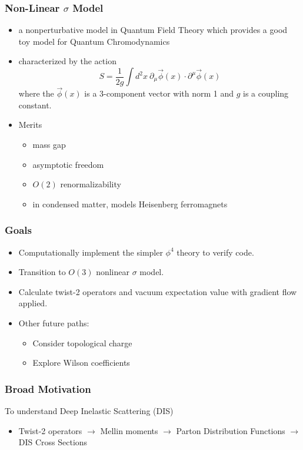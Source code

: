 \documentclass{beamer}
\begin{document}
\begin{frame}
\frametitle{Non-Linear $\sigma$ Model}
\begin{itemize}
    \item a nonperturbative model in Quantum Field Theory which provides a good toy model for Quantum Chromodynamics
    \item characterized by the action
        \begin{equation*}
            S = \frac{1}{2g} \int d^2x \: \partial_\mu \vec{\phi}(x) \cdot \partial^\mu \vec{\phi}(x)
        \end{equation*}
    where the $\vec{\phi}(x)$ is a 3-component vector with norm 1 and $g$ is a coupling constant. 
\item Merits 
    \begin{itemize}
        \item mass gap
        \item asymptotic freedom
        \item $O(2)$ renormalizability
        \item in condensed matter, models Heisenberg ferromagnets
    \end{itemize}
\end{itemize}
\end{frame}

\begin{frame}
    \frametitle{Goals}
    \begin{itemize}
        \item Computationally implement the simpler $\phi^4$ theory to verify code.
        \item Transition to $O(3)$ nonlinear $\sigma$ model.
        \item Calculate twist-2 operators and vacuum expectation value with gradient flow applied.
        \item Other future paths:
            \begin{itemize}
                \item Consider topological charge
                \item Explore Wilson coefficients 
            \end{itemize}

    \end{itemize}
\end{frame}

\begin{frame}
    \frametitle{Broad Motivation}
    To understand Deep Inelastic Scattering (DIS)
    \begin{itemize}
        \item Twist-2 operators $\rightarrow$ Mellin moments $\rightarrow$ Parton Distribution Functions $\rightarrow$ DIS Cross Sections
    \end{itemize}
\end{frame}
\end{document}
